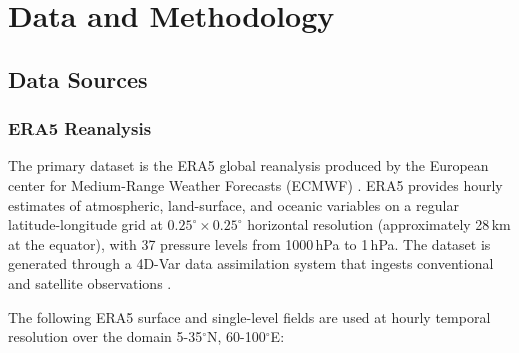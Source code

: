 
\ifpdf
\graphicspath{{chapters/Figs/}{chapters/Figs/Raster/}{Figs/PDF/}{Figs/}}
\else
\graphicspath{{chapters/Figs/}{chapters/Figs/Vector/}{Figs/}}
\fi

\chapter{Data and Methodology}
\label{ch:methodology}

\section{Data Sources}
\label{sec:data_sources}

\subsection{ERA5 Reanalysis}
\label{subsec:era5}

The primary dataset is the ERA5 global reanalysis produced by the
European center for Medium-Range Weather Forecasts (ECMWF)
\autocite{hersbach2020era5}. ERA5 provides hourly estimates of
atmospheric, land-surface, and oceanic variables on a regular
latitude-longitude grid at $0.25^\circ \times 0.25^\circ$ horizontal
resolution (approximately 28\,km at the equator), with 37 pressure
levels from 1000\,hPa to 1\,hPa. The dataset is generated through a
4D-Var data assimilation system that ingests conventional and
satellite observations \autocite{hersbach2020era5}.

The following ERA5 surface and single-level fields are used at hourly
temporal resolution over the domain 5-35$^\circ$N, 60-100$^\circ$E:

